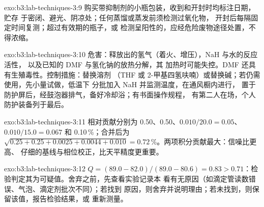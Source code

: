 \begin{solution}{exo:b3:lab-techniques-3:9}
购买带抑制剂的小瓶包装，收到和开封时均标注日期，贮存
于密闭、避光、阴凉处；任何蒸馏或蒸发前须检测过氧化物，
开封后每隔固定时间复测；超过有效期的瓶子，或
检测呈阳性的，应经危险废物途径处置，不得浓缩。
\end{solution}

\begin{solution}{exo:b3:lab-techniques-3:10}
危害：释放出的氢气（着火、增压），NaH 与水的反应活性，
以及已知的 DMF 与氢化钠的放热分解，其
加热时可能失控。DMF 还具有生殖毒性。控制措施：替换溶剂
（THF 或 2-甲基四氢呋喃）或替换碱；若仍需使用，先小量试做，低温下
分批加入 NaH 并监测温度，在通风橱内进行，
置于防护屏后，经鼓泡器排气，备好冷却浴；有书面操作规程，
有第二人在场，个人防护装备列于最后。
\end{solution}

\begin{solution}{exo:b3:lab-techniques-3:11}
相对贡献分别为 0.50、0.50、$0.010/20.0 = 0.05$、$0.010/15.0 = 0.067$ 和 0.10\,\%；合并后为
$\sqrt{0.25 + 0.25 + 0.0025 + 0.0044 + 0.010} = 0.72$\,\%。两项积分贡献最大：信噪比更高、
仔细的基线与相位校正，比天平精度更重要。
\end{solution}

\begin{solution}{exo:b3:lab-techniques-3:12}
$Q = (89.0 - 82.0)/(89.0 - 80.6) = 0.83 > 0.71$：检验判定其为可疑值。舍弃之前，先查看实验记录本
看有无原因（如滴定管读数错误、气泡、滴定剂批次不同）；若找到
原因，则舍弃并说明理由；若未找到，则保留该值，报告检验结果，或
重新测量。
\end{solution}


